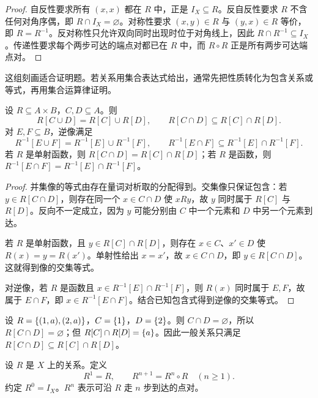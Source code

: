 \begin{proof}
自反性要求所有 $(x,x)$ 都在 $R$ 中，正是 $I_X\subseteq R$。反自反性要求 $R$ 不含任何对角序偶，即 $R\cap I_X=\varnothing$。对称性要求 $(x,y)\in R$ 与 $(y,x)\in R$ 等价，即 $R=R^{-1}$。反对称性只允许双向同时出现时位于对角线上，因此 $R\cap R^{-1}\subseteq I_X$。传递性要求每个两步可达的端点对都已在 $R$ 中，而 $R\circ R$ 正是所有两步可达端点对。
\end{proof}

这组刻画适合证明题。若关系用集合表达式给出，通常先把性质转化为包含关系或等式，再用集合运算律证明。

\begin{theorem}[像与集合运算]\label{ch2-image-laws}
设 $R\subseteq A\times B$，$C,D\subseteq A$。则
\[
R[C\cup D]=R[C]\cup R[D],
\qquad
R[C\cap D]\subseteq R[C]\cap R[D].
\]
对 $E,F\subseteq B$，逆像满足
\[
R^{-1}[E\cup F]=R^{-1}[E]\cup R^{-1}[F],
\qquad
R^{-1}[E\cap F]\subseteq R^{-1}[E]\cap R^{-1}[F].
\]
若 $R$ 是单射函数，则 $R[C\cap D]=R[C]\cap R[D]$；若 $R$ 是函数，则 $R^{-1}[E\cap F]=R^{-1}[E]\cap R^{-1}[F]$。
\end{theorem}

\begin{proof}
并集像的等式由存在量词对析取的分配得到。交集像只保证包含：若 $y\in R[C\cap D]$，则存在同一个 $x\in C\cap D$ 使 $xRy$，故 $y$ 同时属于 $R[C]$ 与 $R[D]$。反向不一定成立，因为 $y$ 可能分别由 $C$ 中一个元素和 $D$ 中另一个元素到达。

若 $R$ 是单射函数，且 $y\in R[C]\cap R[D]$，则存在 $x\in C$、$x'\in D$ 使 $R(x)=y=R(x')$。单射性给出 $x=x'$，故 $x\in C\cap D$，即 $y\in R[C\cap D]$。这就得到像的交集等式。

对逆像，若 $R$ 是函数且 $x\in R^{-1}[E]\cap R^{-1}[F]$，则 $R(x)$ 同时属于 $E,F$，故属于 $E\cap F$，即 $x\in R^{-1}[E\cap F]$。结合已知包含式得到逆像的交集等式。
\end{proof}

\begin{pitfall}[一般关系的交集像不能随意取等号]\label{ch2-image-intersection-pitfall}
设 $R=\{(1,a),(2,a)\}$，$C=\{1\}$，$D=\{2\}$。则 $C\cap D=\varnothing$，所以 $R[C\cap D]=\varnothing$；但 $R[C]\cap R[D]=\{a\}$。因此一般关系只满足 $R[C\cap D]\subseteq R[C]\cap R[D]$。
\end{pitfall}

\begin{definition}[关系的幂]\label{ch2-relation-powers}
设 $R$ 是 $X$ 上的关系。定义
\[
  R^1=R,\qquad R^{n+1}=R^n\circ R\quad(n\ge1).
\]
约定 $R^0=I_X$。$R^n$ 表示可沿 $R$ 走 $n$ 步到达的点对。
\end{definition}

